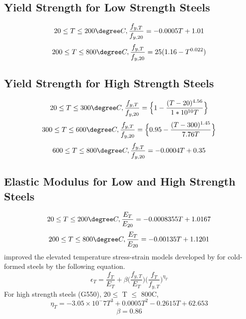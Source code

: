  \subsection*{Yield Strength for Low Strength Steels}
\begin{equation}
20 \leq T \leq 200\degree C , \dfrac{f_{y,T}}{f_{y,20}} = -0.0005T+1.01
\label{eq:yield_low1}
\end{equation}
\begin{equation}
200 \leq T \leq 800\degree C , \dfrac{f_{y,T}}{f_{y,20}} = 25(1.16-T^{0.022})
\label{eq:yield_low2}
\end{equation}
\subsection*{Yield Strength for High Strength Steels}
\begin{equation}
20 \leq T \leq 300\degree C , \dfrac{f_{y,T}}{f_{y,20}} = \Big\{ 1-\dfrac{(T-20)^{4.56}}{1*10^{10}T} \Big\}
\label{eq:yield_low3}
\end{equation}
\begin{equation}
300 \leq T \leq 600\degree C , \dfrac{f_{y,T}}{f_{y,20}} = \Big\{ 0.95-\dfrac{(T-300)^{1.45}}{7.76T} \Big\}
\label{eq:yield_low4}
\end{equation}
\begin{equation}
600 \leq T \leq 800\degree C , \dfrac{f_{y,T}}{f_{y,20}} = -0.0004T + 0.35
\label{eq:yield_low5}
\end{equation}
\subsection*{Elastic Modulus for Low and High Strength Steels}
\begin{equation}
20 \leq T \leq 200\degree C , \dfrac{E_T}{E_{20}} = -0.0008355T+1.0167
\label{eq:yield_high1}
\end{equation}
\begin{equation}
200 \leq T \leq 800\degree C , \dfrac{E_T}{E_{20}} = -0.00135T+1.1201
\label{eq:yield_high2}
\end{equation}
\citet{Kankanamge2011} improved the elevated temperature stress-strain models developed by \citet{Ranawaka2009} for cold-formed steels by the following equation. 
\begin{equation}
\epsilon_T = \dfrac{f_T}{E_T} + \beta \Big(\dfrac{f_{y,T}}{E_T}\Big)\Big(\dfrac{f_T}{f_{y,T}}\Big)^{\eta_{T}}
\label{eq:yield_high3}
\end{equation}
For high strength steels (G550), 20$ \leq$ T $\leq$ 800\degree C,
\begin{equation}
	\eta_T = -3.05 \times 10^-7 T^3 + 0.0005T^2 - 0.2615T + 62.653
	\label{eq:yield_high4}
\end{equation}
\begin{equation*}
\beta=0.86
\end{equation*}
		
